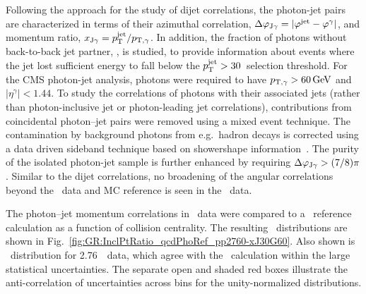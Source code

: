 Following the approach for the study of dijet correlations, the photon-jet pairs
are characterized in terms of their azimuthal correlation, $\Delta\varphi_{\mathrm{J}\gamma} = |\varphi^\mathrm{jet} - \varphi^{\gamma}|$,
 and momentum ratio, $x_{\mathrm{J}\gamma} = p_{\mathrm{T}}^{\mathrm{jet}}/p_{\mathrm{T},\gamma}$. In addition, the fraction of photons without
back-to-back jet partner,  \rjg, is studied, to provide information about
events where the jet lost sufficient energy to fall below the $p_{\mathrm{T}}^{\mathrm{jet}} > 30$\GeVc\
selection threshold.
For the CMS photon-jet analysis, photons were required to have $p_{\mathrm{T},\gamma} > 60\,\mathrm{GeV}$
and  $|\eta^\gamma|<1.44$.
To study the correlations of
photons with their associated jets (rather than photon-inclusive jet or photon-leading
jet correlations), contributions from
coincidental photon--jet pairs were removed using a mixed event technique. The
contamination by background photons from e.g.\ hadron decays
is corrected using a data driven sideband technique based on showershape
information~\cite{HIPhoton}. The purity of the isolated photon-jet
sample is further enhanced by requiring $\Delta\varphi_{\mathrm{J}\gamma} > (7/8) \pi$.
Similar to the dijet correlations, no broadening of the angular correlations
beyond the \pp\ data and MC reference is seen in the \PbPb\ data.

The photon--jet momentum correlations in \PbPb\ data were compared to a \PYTHYD\ reference
calculation as a function of collision centrality. The resulting
\xjg\ distributions are shown in Fig.~\ref{fig:GR:InclPtRatio_qcdPhoRef_pp2760-xJ30G60}.
Also shown is \avexjg\ distribution for 2.76\TeV\ \pp\ data, which agree
with the \PYTHYD\ calculation within the large statistical uncertainties.
The separate open and shaded red boxes illustrate the
anti-correlation of uncertainties across bins for the unity-normalized distributions.

